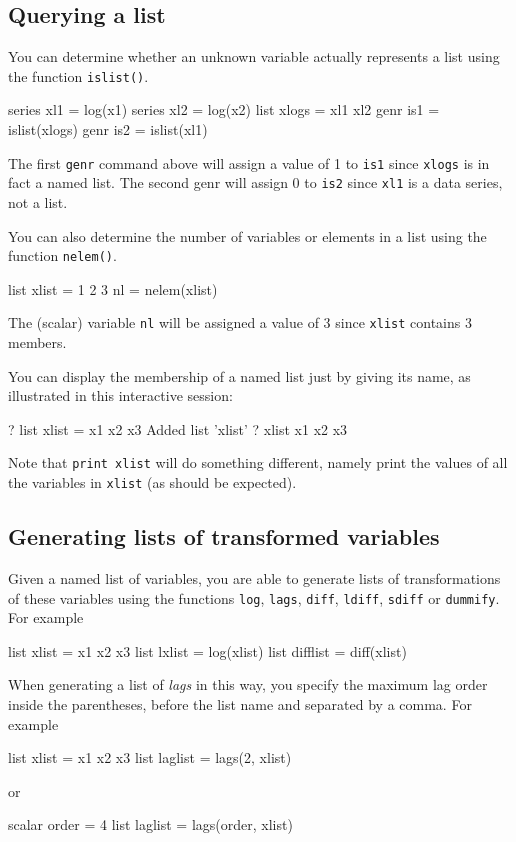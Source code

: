 \subsection{Querying a list}

You can determine whether an unknown variable actually represents a list
using the function \texttt{islist()}.
%
\begin{code}
series xl1 = log(x1)
series xl2 = log(x2)
list xlogs = xl1 xl2
genr is1 = islist(xlogs)
genr is2 = islist(xl1)
\end{code}

The first \texttt{genr} command above will assign a value of 1 to
\texttt{is1} since \texttt{xlogs} is in fact a named list.  The second
genr will assign 0 to \texttt{is2} since \texttt{xl1} is a data
series, not a list.  

You can also determine the number of variables or elements in a list
using the function \texttt{nelem()}.
%
\begin{code}
list xlist = 1 2 3
nl = nelem(xlist)
\end{code}

The (scalar) variable \texttt{nl} will be assigned a value of 3 since
\texttt{xlist} contains 3 members.

You can display the membership of a named list just by giving its name,
as illustrated in this interactive session:
%
\begin{code}
? list xlist = x1 x2 x3
Added list 'xlist'
? xlist
 x1 x2 x3
\end{code}
%
Note that \texttt{print xlist} will do something different, namely
print the values of all the variables in \texttt{xlist} (as should be
expected).

\subsection{Generating lists of transformed variables}

Given a named list of variables, you are able to generate lists of
transformations of these variables using the functions \texttt{log},
\texttt{lags}, \texttt{diff}, \texttt{ldiff}, \texttt{sdiff} or
\texttt{dummify}.  For example
%
\begin{code}
list xlist = x1 x2 x3
list lxlist = log(xlist)
list difflist = diff(xlist)
\end{code}

When generating a list of \textit{lags} in this way, you specify the
maximum lag order inside the parentheses, before the list name and
separated by a comma.  For example
%
\begin{code}
list xlist = x1 x2 x3
list laglist = lags(2, xlist)
\end{code}
%
or
%
\begin{code}
scalar order = 4
list laglist = lags(order, xlist)
\end{code}


